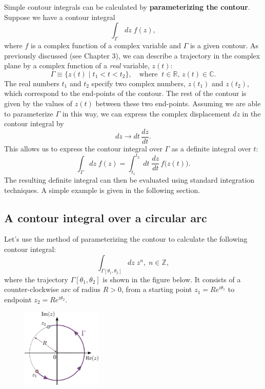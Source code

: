 \documentclass[10pt,a4paper]{article}
\begin{document}
Simple contour integrals can be calculated by \textbf{parameterizing
  the contour}. Suppose we have a contour integral
\begin{equation}
  \int_\Gamma \, dz \; f(z),
\end{equation}
where $f$ is a complex function of a complex variable and $\Gamma$ is
a given contour.  As previously discussed (see Chapter 3), we can
describe a trajectory in the complex plane by a complex function of a
\emph{real} variable, $z(t)$:
\begin{equation}
  \Gamma \equiv \Big\{z(t) \;\Big|\; t_1 < t < t_2\Big\},
  \quad \mathrm{where}\;\; t \in \mathbb{R}, \,z(t) \in \mathbb{C}.
\end{equation}
The real numbers $t_1$ and $t_2$ specify two complex numbers, $z(t_1)$
and $z(t_2)$, which correspond to the end-points of the contour. The
rest of the contour is given by the values of $z(t)$ between these two
end-points. Assuming we are able to parameterize $\Gamma$ in this way,
we can express the complex displacement $dz$ in the contour integral
by
\begin{equation}
  dz \rightarrow dt\, \frac{dz}{dt}.
\end{equation}
This allows us to express the contour integral over $\Gamma$ as a
definite integral over $t$:
\begin{equation}
  \int_\Gamma dz\; f(z) = \int_{t_1}^{t_2} \; dt\; \frac{dz}{dt}\, f\Big(z(t)\Big).
\end{equation}
The resulting definite integral can then be evaluated using standard
integration techniques. A simple example is given in the following
section.

\subsection{A contour integral over a circular arc}
\label{arc_contour}

Let's use the method of parameterizing the contour to calculate the
following contour integral:
\begin{equation}
  \int_{\Gamma[\theta_1,\theta_2]} dz\; z^n,\; n\in\mathbb{Z},
\end{equation}
where the trajectory $\Gamma[\theta_1,\theta_2]$ is shown in the
figure below. It consists of a counter-clockwise arc of radius $R >
0$, from a starting point $z_1 = R e^{i\theta_1}$ to endpoint $z_2 = R
e^{i\theta_2}$.

\begin{figure}[h]
  \centering\includegraphics[width=0.34\textwidth]{complex_integral_example}
\end{figure}
\end{document}
